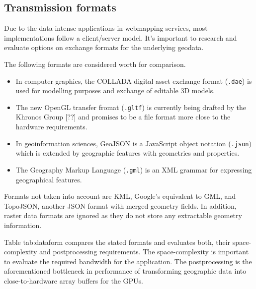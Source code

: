     \subsection{Transmission formats}
      \label{sec:conct:preli:forma}
      Due to the data-intense applications in webmapping services, most implementations follow a client/server model. It's important to research and evaluate options on exchange formats for the underlying geodata.\par
      The following formats are considered worth for comparison.
      \begin{itemize}
      \item In computer graphics, the COLLADA digital asset exchange format (\texttt{.dae}) is used for modelling purposes and exchange of editable 3D models.
      \item The new OpenGL transfer fromat (\texttt{.gltf}) is currently being drafted by the Khronos Group [??] and promises to be a file format more close to the hardware requirements.
      \item In geoinformation sciences, GeoJSON is a JavaScript object notation (\texttt{.json}) which is extended by geographic features with geometries and properties.
      \item The Geography Markup Language (\texttt{.gml}) is an XML grammar for expressing geographical features.
      \end{itemize}
      Formats not taken into account are KML, Google's equivalent to GML, and TopoJSON, another JSON format with merged geometry fields. In addition, raster data formats are ignored as they do not store any extractable geometry information.\par
      Table {tab:dataform} compares the stated formats and evaluates both, their space-complexity and postprocessing requirements. The space-complexity is important to evaluate the required bandwidth for the application. The postprocessing is the aforementioned bottleneck in performance of transforming geographic data into close-to-hardware array buffers for the GPUs.\par

